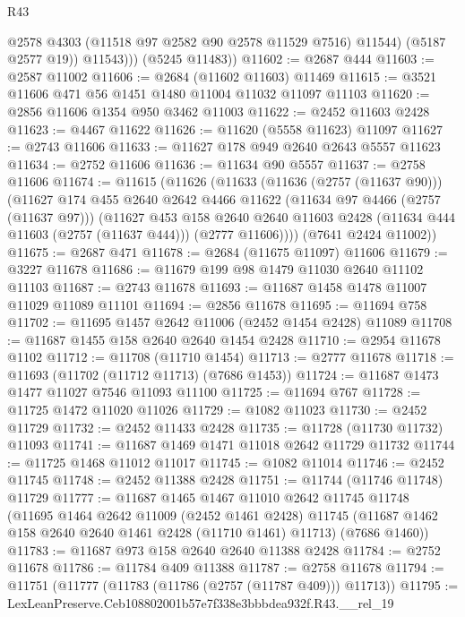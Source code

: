 \begin{lexlean}{R43}
\begin{coremodule}
                @2578
                @4303
                (@11518 @97 @2582 @90 @2578 @11529 @7516)
                @11544)
              (@5187 @2577 @19))
            @11543)))
      (@5245 @11483))
@11602 := @2687 @444
@11603 := @2587 @11002
@11606 := @2684 (@11602 @11603) @11469
@11615 := @3521 @11606 @471 @56 @1451 @1480 @11004 @11032 @11097 @11103
@11620 := @2856 @11606 @1354 @950 @3462 @11003
@11622 := @2452 @11603 @2428
@11623 := @4467 @11622
@11626 := @11620 (@5558 @11623) @11097
@11627 := @2743 @11606
@11633 := @11627 @178 @949 @2640 @2643 @5557 @11623
@11634 := @2752 @11606
@11636 := @11634 @90 @5557
@11637 := @2758 @11606
@11674 := @11615
    (@11626
      (@11633
        (@11636 (@2757 (@11637 @90)))
        (@11627
          @174
          @455
          @2640
          @2642
          @4466
          @11622
          (@11634 @97 @4466 (@2757 (@11637 @97)))
          (@11627
            @453
            @158
            @2640
            @2640
            @11603
            @2428
            (@11634 @444 @11603 (@2757 (@11637 @444)))
            (@2777 @11606))))
      (@7641 @2424 @11002))
@11675 := @2687 @471
@11678 := @2684 (@11675 @11097) @11606
@11679 := @3227 @11678
@11686 := @11679 @199 @98 @1479 @11030 @2640 @11102 @11103
@11687 := @2743 @11678
@11693 := @11687 @1458 @1478 @11007 @11029 @11089 @11101
@11694 := @2856 @11678
@11695 := @11694 @758
@11702 := @11695 @1457 @2642 @11006 (@2452 @1454 @2428) @11089
@11708 := @11687 @1455 @158 @2640 @2640 @1454 @2428
@11710 := @2954 @11678 @1102
@11712 := @11708 (@11710 @1454)
@11713 := @2777 @11678
@11718 := @11693 (@11702 (@11712 @11713) (@7686 @1453))
@11724 := @11687 @1473 @1477 @11027 @7546 @11093 @11100
@11725 := @11694 @767
@11728 := @11725 @1472 @11020 @11026
@11729 := @1082 @11023
@11730 := @2452 @11729
@11732 := @2452 @11433 @2428
@11735 := @11728 (@11730 @11732) @11093
@11741 := @11687 @1469 @1471 @11018 @2642 @11729 @11732
@11744 := @11725 @1468 @11012 @11017
@11745 := @1082 @11014
@11746 := @2452 @11745
@11748 := @2452 @11388 @2428
@11751 := @11744 (@11746 @11748) @11729
@11777 := @11687
    @1465
    @1467
    @11010
    @2642
    @11745
    @11748
    (@11695
      @1464
      @2642
      @11009
      (@2452 @1461 @2428)
      @11745
      (@11687 @1462 @158 @2640 @2640 @1461 @2428 (@11710 @1461) @11713)
      (@7686 @1460))
@11783 := @11687 @973 @158 @2640 @2640 @11388 @2428
@11784 := @2752 @11678
@11786 := @11784 @409 @11388
@11787 := @2758 @11678
@11794 := @11751 (@11777 (@11783 (@11786 (@2757 (@11787 @409))) @11713))
@11795 := LexLeanPreserve.Ceb108802001b57e7f338e3bbbdea932f.R43.__rel_19

\end{coremodule}
\end{lexlean}
